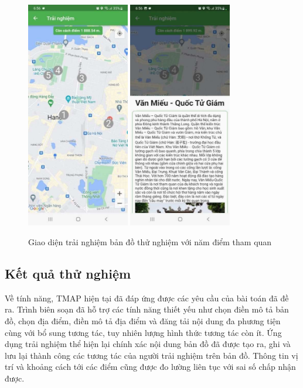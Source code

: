 \begin{figure}[h]
    \centering
    \includegraphics[width=0.4\textwidth]{figures/test-map-points-1.jpg}
    \includegraphics[width=0.4\textwidth]{figures/test-map-points-2.jpg}
    \caption{Giao diện trải nghiệm bản đồ thử nghiệm với năm điểm tham quan}
    \label{fig:test-map-points}
\end{figure}
\newpage
\subsection{Kết quả thử nghiệm}
Về tính năng, TMAP hiện tại đã đáp ứng được các yêu cầu của bài toán đã đề
ra. Trình biên soạn đã hỗ trợ các tính năng thiết yếu như chọn điền mô tả bản đồ, chọn
địa điểm, điền mô tả địa điểm và đăng tải nội dung đa phương tiện cùng với bổ sung
tương tác, tuy nhiên lượng hình thức tương tác còn ít. Ứng dụng trải nghiệm thể hiện
lại chính xác nội dung bản đồ đã được tạo ra, ghi và lưu lại thành công các tương tác
của người trải nghiệm trên bản đồ. Thông tin vị trí và khoảng cách tới các điểm cũng
được đo lường liên tục với sai số chấp nhận được.

